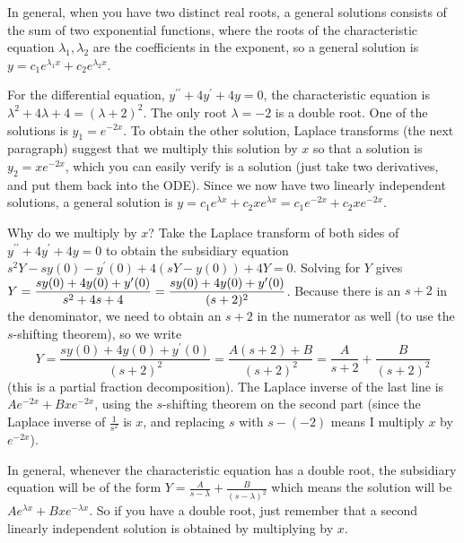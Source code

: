 In general, when you have two distinct real roots, a general solutions consists of the sum of two exponential functions, where the roots of the characteristic equation $\lambda_1,\lambda_2$ are the coefficients in the exponent, so a general solution is $y=c_1e^{\lambda_1 x}+c_2e^{\lambda_2 x}$. 

\begin{example}
For the differential equation, $y^{\prime\prime}+4y^\prime+4y=0$, the characteristic equation is $\lambda^2+4\lambda+4 = (\lambda+2)^2$.  The only root $\lambda=-2$ is a double root. One of the solutions is $y_1=e^{-2x}$. To obtain the other solution, Laplace transforms (the next paragraph) suggest that we multiply this solution by $x$ so that a solution is $y_2=xe^{-2x}$, which you can easily verify is a solution (just take two derivatives, and put them back into the ODE). Since we now have two linearly independent solutions, a general solution is $y=c_1e^{\lambda x}+c_2xe^{\lambda x} = c_1e^{-2x} + c_2xe^{-2 x}$.

Why do we multiply by $x$? Take the Laplace transform of both sides of $y^{\prime\prime}+4y^\prime+4y=0$ to obtain the subsidiary equation $s^2Y-sy(0)-y^\prime(0) + 4(sY-y(0)) +4Y=0$.  Solving for $Y$ gives $Y = \displaystyle\frac{sy(0)+4y(0)+y^\prime(0)}{s^2+4s+4} = \frac{sy(0)+4y(0)+y^\prime(0)}{(s+2)^2}$. Because there is an $s+2$ in the denominator, we need to obtain an $s+2$ in the numerator as well (to use the $s$-shifting theorem), so we write 
$$Y=\frac{s y(0)+4y(0)+y^\prime(0)}{(s+2)^2} =\frac{A(s+2)+B}{(s+2)^2} = \frac{A}{s+2} +\frac{B}{(s+2)^2}$$ (this is a partial fraction decomposition). The Laplace inverse of the last line is $Ae^{-2x}+Bxe^{-2x}$, using the $s$-shifting theorem on the second part (since the Laplace inverse of $\frac{1}{s^2}$ is $x$, and replacing $s$ with $s-(-2)$ means I multiply $x$ by $e^{-2x}$).
\end{example}

In general, whenever the characteristic equation has a double root, the subsidiary equation will be of the form $Y=\frac{A}{s-\lambda} +\frac{B}{(s-\lambda)^2}$ which means the solution will be $Ae^{\lambda x}+Bxe^{-\lambda x}$. So if you have a double root, just remember that a second linearly independent solution is obtained by multiplying by $x$.

